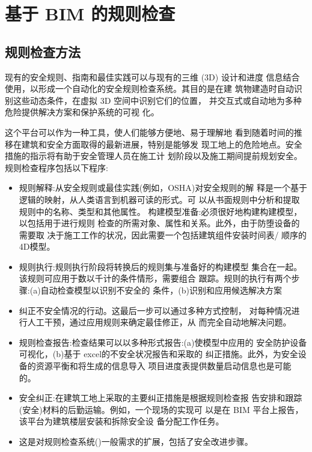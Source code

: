 \section{基于 BIM 的规则检查}
\subsection{规则检查方法}
现有的安全规则、指南和最佳实践可以与现有的三维 (3D) 设计和进度
信息结合使用，以形成一个自动化的安全规则检查系统。其目的是在建
筑物建造时自动识别这些动态条件，在虚拟 3D 空间中识别它们的位置，
并交互式或自动地为多种危险提供解决方案和保护系统的可视
化。

这个平台可以作为一种工具，使人们能够方便地、易于理解地
看到随着时间的推移在建筑和安全方面取得的最新进展，特别是能够发
现工地上的危险地点。安全措施的指示将有助于安全管理人员在施工计
划阶段以及施工期间提前规划安全。规则检查程序包括以下程序:

\begin{itemize}
    \item 规则解释:从安全规则或最佳实践(例如，OSHA)对安全规则的解
    释是一个基于逻辑的映射，从人类语言到机器可读的形式。可
    以从书面规则中分析和提取规则中的名称、类型和其他属性。
    构建模型准备:必须很好地构建构建模型，以包括用于进行规则
    检查的所需对象、属性和关系。此外，由于防堕设备的需要取
    决于施工工作的状况，因此需要一个包括建筑组件安装时间表/
    顺序的 4D模型。
    \item 规则执行:规则执行阶段将转换后的规则集与准备好的构建模型
    集合在一起。该规则可应用于数以千计的条件情形，需要组合
    跟踪。规则的执行有两个步骤:(a)自动检查模型以识别不安全的
    条件，(b)识别和应用候选解决方案
    \item 纠正不安全情况的行动。这最后一步可以通过多种方式控制，
    对每种情况进行人工干预，通过应用规则来确定最佳修正，从
    而完全自动地解决问题。
    \item 规则检查报告:检查结果可以以多种形式报告:(a)使模型中应用的
    安全防护设备可视化，(b)基于 excel的不安全状况报告和采取的
    纠正措施。此外，为安全设备的资源平衡和将生成的信息导入
    项目进度表提供数量启动信息也是可能的。
    \item 安全纠正:在建筑工地上采取的主要纠正措施是根据规则检查报
    告安排和跟踪(安全)材料的后勤运输。例如，一个现场的实现可
    以是在 BIM 平台上报告，该平台为建筑楼层安装和拆除安全设
    备分配工作任务。
    \item 这是对规则检查系统()一般需求的扩展，包括了安全改进步骤。
\end{itemize}

